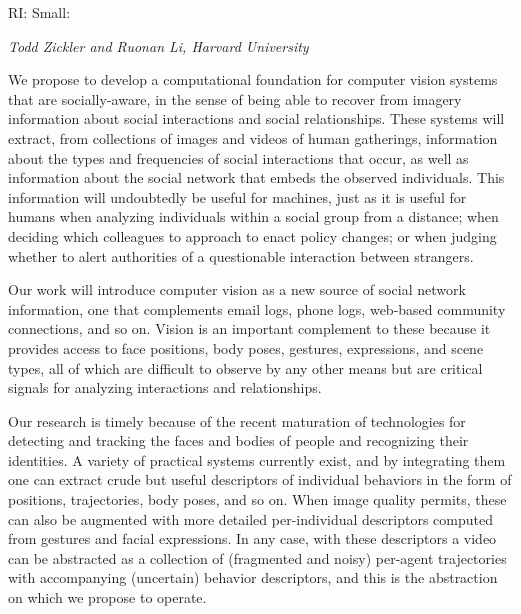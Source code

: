 \pagestyle{empty}

\noindent\textsf{RI: Small:}\vspace{0.9ex}\\

\vspace{1.3ex}
\noindent \textsf{\large \em Todd Zickler and Ruonan Li, Harvard University}
\vspace{2.5ex}

\noindent We propose to develop a computational foundation for computer vision systems that are socially-aware, in the sense of being able to recover from imagery information about social interactions and social relationships. These systems will extract, from collections of images and videos of human gatherings, information about the types and frequencies of social interactions that occur, as well as information about the social network that embeds the observed individuals. This information will undoubtedly be useful for machines, just as it is useful for humans when analyzing individuals within a social group from a distance; when deciding which colleagues to approach to enact policy changes; or when judging whether to alert authorities of a questionable interaction between strangers.

Our work will introduce computer vision as a new source of social network information, one that complements email logs, phone logs, web-based community connections, and so on. Vision is an important complement to these because it provides access to face positions, body poses, gestures, expressions, and scene types, all of which are difficult to observe by any other means but are critical signals for analyzing interactions and relationships.

Our research is timely because of the recent maturation of technologies for detecting and tracking the faces and bodies of people and recognizing their identities. A variety of practical systems currently exist, and by integrating them one can extract crude but useful descriptors of individual behaviors in the form of positions, trajectories, body poses, and so on. When image quality permits, these can also be augmented with more detailed per-individual descriptors computed from gestures  and facial expressions. In any case, with these descriptors a video can be abstracted as a collection of (fragmented and noisy) per-agent trajectories with accompanying (uncertain) behavior descriptors, and this is the abstraction on which we propose to operate.

